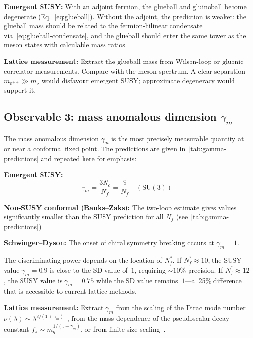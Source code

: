 \documentclass[11pt,a4paper]{article}
\theoremstyle{plain}
\theoremstyle{definition}
\theoremstyle{remark}
\newcommand{\Nc}{N_{\!c}}
\newcommand{\Nf}{N_{\!f}}
\newcommand{\Nfstar}{\Nf^*}
\newcommand{\SU}[1]{\mathrm{SU}(#1)}
\begin{document}
\textbf{Emergent SUSY:}  With an adjoint fermion, the glueball and
gluinoball become degenerate (Eq.~\eqref{eq:glueball}).  Without
the adjoint, the prediction is weaker: the glueball mass should be
related to the fermion-bilinear condensate
via~\eqref{eq:glueball-condensate}, and the glueball should enter
the same tower as the meson states with calculable mass ratios.

\textbf{Lattice measurement:}  Extract the glueball mass from
Wilson-loop or gluonic correlator measurements.  Compare with the
meson spectrum.  A clear separation $m_{0^{++}} \gg m_\sigma$ would
disfavour emergent SUSY; approximate degeneracy would support it.


\subsection{Observable 3: mass anomalous dimension $\gamma_m$}
\label{ssec:obs3}

The mass anomalous dimension $\gamma_m$ is the most precisely
measurable quantity at or near a conformal fixed point.  The
predictions are given in~\cref{tab:gamma-predictions} and repeated
here for emphasis:

\textbf{Emergent SUSY:}
\begin{equation}\label{eq:obs3-SUSY}
  \boxed{
    \gamma_m = \frac{3\Nc}{\Nf}
    = \frac{9}{\Nf}\quad (\SU{3})
  }
\end{equation}

\textbf{Non-SUSY conformal (Banks--Zaks):}  The two-loop estimate gives
values significantly smaller than the SUSY prediction for all $\Nf$
(see~\cref{tab:gamma-predictions}).

\textbf{Schwinger--Dyson:}  The onset of chiral symmetry breaking
occurs at $\gamma_m = 1$.

The discriminating power depends on the location of $\Nfstar$.  If
$\Nfstar \approx 10$, the SUSY value $\gamma_m = 0.9$ is close to
the SD value of~$1$, requiring $\sim 10\%$ precision.  If
$\Nfstar \approx 12$, the SUSY value is $\gamma_m = 0.75$ while the
SD value remains~$1$---a~25\% difference that is accessible to
current lattice methods.

\textbf{Lattice measurement:}  Extract $\gamma_m$ from the scaling of
the Dirac mode number
$\nu(\lambda) \sim \lambda^{3/(1+\gamma_m)}$~\cite{Patella2012}, from
the mass dependence of the pseudoscalar decay constant
$f_\pi \sim m_q^{1/(1+\gamma_m)}$, or from finite-size
scaling~\cite{DeGrand2015}.
\end{document}
